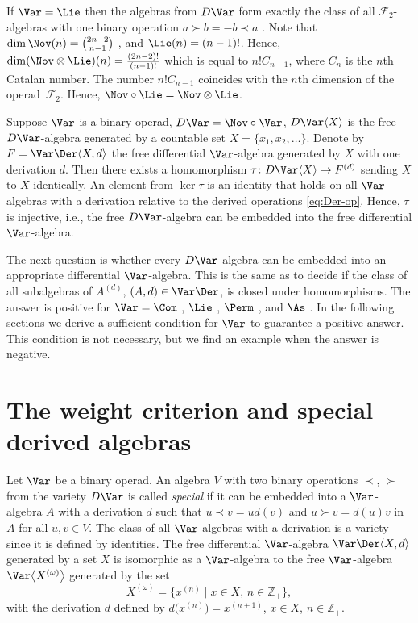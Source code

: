 If $\Var = \Lie $ then the algebras from $D\Var $ form exactly the class of
all $\mathcal F_2$-algebras with one binary operation $a\succ b = -b\prec a$ \cite{KSO2019}.
Note that $\dim \Nov(n) = \binom{2n-2}{n-1}$ \cite{Dzhumad-codimgrowth}, and $\Lie(n)=(n-1)!$.
Hence,
$\dim (\Nov\otimes \Lie)(n) = \frac{(2n-2)!}{(n-1)!}$ which is equal
to $n!C_{n-1}$, where $C_n$ is the $n$th Catalan number.
The number $n!C_{n-1}$ coincides with the $n$th dimension
of the operad~$\mathcal F_2$.
Hence,
$\Nov\circ \Lie = \Nov \otimes \Lie $.

Suppose $\Var $ is a binary operad, $D\Var = \Nov\circ \Var$,
$D\Var\langle X\rangle $ is the free $D\Var$-algebra generated by a countable set
$X=\{x_1,x_2,\dots \}$. Denote by $F=\Var\Der\langle X,d\rangle $ the
free differential $\Var $-algebra generated by $X$ with one derivation $d$.
Then there exists a homomorphism $\tau \colon D\Var\langle X\rangle \to F^{(d)}$
sending $X$ to $X$ identically.
An element from $\ker \tau $ is an identity that holds on all $\Var $-algebras
with a derivation relative to the derived operations \eqref{eq:Der-op}.
Hence, $\tau $ is injective, i.e., the free $D\Var$-algebra
can be embedded into the free differential $\Var $-algebra.

The next question is whether every $D\Var$-algebra can be embedded into an
appropriate differential $\Var $-algebra.
This is the same as to decide if the class of all subalgebras of $A^{(d)}$,
$(A,d)\in \Var\Der$, is closed under homomorphisms.
The answer is positive
for $\Var = \Com $ \cite{BCZ-2017}, $\Lie $ \cite{KSO2019}, $\Perm $ \cite{KS2022}, and $\As $ \cite{SK-2022}.
In the following sections we derive a sufficient condition
for $\Var $ to guarantee a positive answer. This condition is
not necessary, but we find an example when the answer is negative.


\section{The weight criterion and special derived algebras}

Let $\Var $ be a binary operad.
An algebra $V$ with two binary operations $\prec$, $\succ $ from the variety
$D\Var $ is called {\em special} if it can be embedded into
a $\Var $-algebra $A$ with a derivation $d$ such that
$u\prec v = ud(v)$ and $u\succ v = d(u)v$ in $A$ for all
$u,v\in V$.
The class of all $\Var $-algebras with a derivation is a variety
since it is defined by identities. The free differential $\Var $-algebra
$\Var\Der\langle X,d\rangle $
generated by a set $X$ is isomorphic as a $\Var$-algebra
to the free $\Var$-algebra $\Var\bigl\langle X^{(\omega )}\bigr\rangle $
generated by the set
\[
X^{(\omega )} = \bigl\{x^{(n)} \mid x\in X,\, n\in \mathbb Z_+ \bigr\},
\]
with the derivation $d$ defined by $d\bigl(x^{(n)}\bigr) = x^{(n+1)}$,
$x\in X$, $n\in \mathbb Z_+$.


